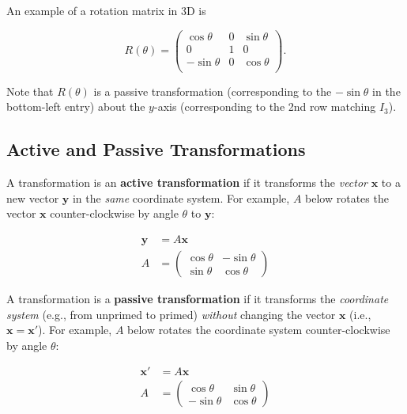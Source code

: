An example of a rotation matrix in 3D is

\begin{equation*}
    R(\theta) = \begin{pmatrix}
        \cos \theta  & 0 & \sin \theta \\
        0            & 1 & 0           \\
        -\sin \theta & 0 & \cos \theta \\
    \end{pmatrix}\text{.}
\end{equation*}

Note that $R(\theta)$ is a passive transformation (corresponding to the $-\sin\theta$ in the bottom-left entry) about the $y$-axis (corresponding to the 2nd row matching $I_3$).

\subsection{Active and Passive Transformations}

A transformation is an \textbf{active transformation} if it transforms the \emph{vector} $\mathbf{x}$ to a new vector $\mathbf{y}$ in the \emph{same} coordinate system. For example, $A$ below rotates the vector $\mathbf{x}$ counter-clockwise by angle $\theta$ to $\mathbf{y}$:

\begin{align*}
    \mathbf{y} & = A\mathbf{x}              \\
    A          & = \begin{pmatrix}
                       \cos\theta & -\sin\theta \\
                       \sin\theta & \cos\theta
                   \end{pmatrix}
\end{align*}

A transformation is a \textbf{passive transformation} if it transforms the \emph{coordinate system} (e.g., from unprimed to primed) \emph{without} changing the vector $\mathbf{x}$ (i.e., $\mathbf{x} = \mathbf{x}'$). For example, $A$ below rotates the coordinate system counter-clockwise by angle $\theta$:

\begin{align*}
    \mathbf{x}' & = A\mathbf{x}              \\
    A           & = \begin{pmatrix}
                        \cos\theta  & \sin\theta \\
                        -\sin\theta & \cos\theta
                    \end{pmatrix}
\end{align*}

